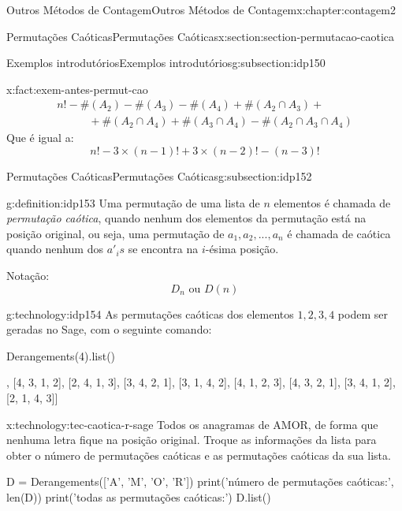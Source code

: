 \documentclass[oneside,10pt,]{book}
\numberwithin{equation}{section}
\begin{document}
\begin{chapterptx}{Outros Métodos de Contagem}{}{Outros Métodos de Contagem}{}{}{x:chapter:contagem2}
\begin{sectionptx}{Permutações Caóticas}{}{Permutações Caóticas}{}{}{x:section:section-permutacao-caotica}
\begin{subsectionptx}{Exemplos introdutórios}{}{Exemplos introdutórios}{}{}{g:subsection:idp150}
\begin{fact}{}{}{x:fact:exem-antes-permut-cao}
\begin{gather*}
n!-\#(A_2)-\#(A_3)-\#(A_4)+\#(A_2\cap A_3)+  \\
~~~~~~~~~~~~~ +\#(A_2\cap A_4)+\#(A_3\cap A_4)-\#(A_2\cap A_3\cap A_4)
\end{gather*}
Que é igual a:%
\begin{equation*}
n!-3\times (n-1)!+3 \times (n-2)!-(n-3)! 
\end{equation*}
%
\end{fact}
\end{subsectionptx}
%
%
\typeout{************************************************}
\typeout{************************************************}
%
\begin{subsectionptx}{Permutações Caóticas}{}{Permutações Caóticas}{}{}{g:subsection:idp152}
\begin{definition}{}{g:definition:idp153}%
Uma permutação de uma lista de \(n\) elementos é chamada de \emph{permutação caótica}, quando nenhum dos elementos da permutação está na posição original, ou seja, uma permutação de \(a_1,a_2, ...,a_n\)  é chamada de caótica quando nenhum dos \(a'_{i}s\) se encontra na \(i\)-ésima posição.%
\par
Notação:%
\begin{equation*}
D_n \text{ ou } D(n) 
\end{equation*}
%
\end{definition}
\begin{technology}{}{g:technology:idp154}%
As permutações caóticas dos elementos \(1, 2, 3, 4\) podem ser geradas no Sage, com o seguinte comando: \begin{sageinput}
Derangements(4).list()
\end{sageinput}
\begin{sageoutput}
[[2, 3, 4, 1],
 [4, 3, 1, 2],
 [2, 4, 1, 3],
 [3, 4, 2, 1],
 [3, 1, 4, 2],
 [4, 1, 2, 3],
 [4, 3, 2, 1],
 [3, 4, 1, 2],
 [2, 1, 4, 3]]
\end{sageoutput}
\end{technology}
\begin{technology}{}{x:technology:tec-caotica-r-sage}%
Todos os anagramas de AMOR, de forma que nenhuma letra fique na posição original. Troque as informações da lista para obter o número de permutações caóticas e as permutações caóticas da sua lista.%
\begin{sageinput}
D = Derangements(['A', 'M', 'O', 'R'])
print('número de permutações caóticas:', len(D))
print('todas as permutações caóticas:')
D.list()
\end{sageinput}

\end{technology}
\end{subsectionptx}
\end{sectionptx}
\end{chapterptx}
\end{document}
